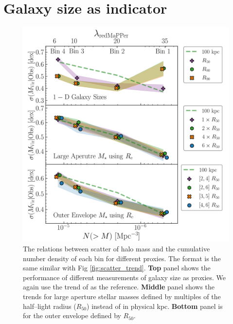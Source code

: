 \documentclass[fleqn,usenatbib,useAMS,english]{mnras}
\begin{document}
\section{Galaxy size as \mvir{} indicator}
	\label{app:size}


  \begin{figure}
      \centering
      \includegraphics[width=13cm]{figure/topn_fig_appendix_2}
      \caption{
          The relations between scatter of halo mass and the cumulative number density of each
          \topn{} bin for different \mhalo{} proxies.
          The format is the same similar with Fig \ref{fig:scatter_trend}.
          \textbf{Top} panel shows the performance of different measurements of galaxy size as
          \mhalo{} proxies.
          We again use the trend of  as the reference.
          \textbf{Middle} panel shows the trends for large aperture stellar masses defined by
          multiples of the half--light radius ($R_{50}$) instead of in physical kpc.
          \textbf{Bottom} panel is for the outer envelope \mstar{} defined by $R_{50}$.
      }
      \label{fig:scatter_trend_2}
  \end{figure}
\end{document}
